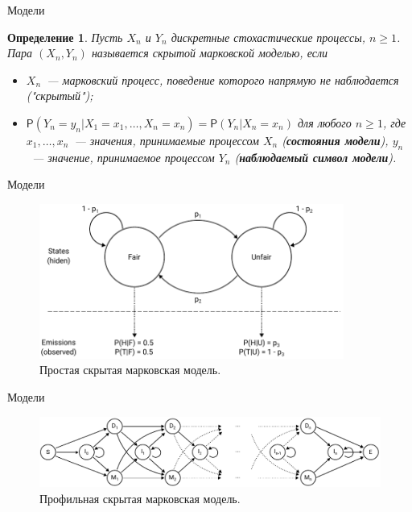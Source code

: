 \documentclass{beamer}
\newtheorem{defenition}{Определение}
\begin{document}
	\begin{frame}{Модели}
		\begin{defenition}
			Пусть $X_{n}$ и $Y_{n}$ дискретные стохастические процессы, $n \geq 1$. Пара $(X_{n}, Y_{n})$ называется скрытой марковской моделью, если
			\begin{itemize}
				\item $X_{n}$~--- марковский процесс, поведение которого напрямую не наблюдается ("скрытый");
				\item $\mathsf{P}(Y_{n} = y_{n}|X_{1} = x_{1},\dots, X_{n} = x_{n}) = \mathsf{P}(Y_{n}|X_{n}=x_{n})$ для любого $n \geq 1$, где $x_{1},\dots,x_{n}$~--- значения, принимаемые процессом  $X_{n}$ (\textbf{состояния модели}), $ y_{n}$~--- значение, принимаемое процессом $Y_{n}$ (\textbf{наблюдаемый символ модели}).
			\end{itemize}
		\end{defenition}		
	\end{frame}

	\begin{frame}{Модели}
		\begin{figure}[h]
			\includegraphics[width=10cm]{../report/figure1}
			\caption{Простая скрытая марковская модель.} \label{fg:1}
		\end{figure}
	\end{frame}

	\begin{frame}{Модели}
		\begin{figure}[h]
			\includegraphics[width=12cm]{../report/figure2}
			\caption{Профильная скрытая марковская модель.}  \label{fg:2}
		\end{figure}		
	\end{frame}
\end{document}
